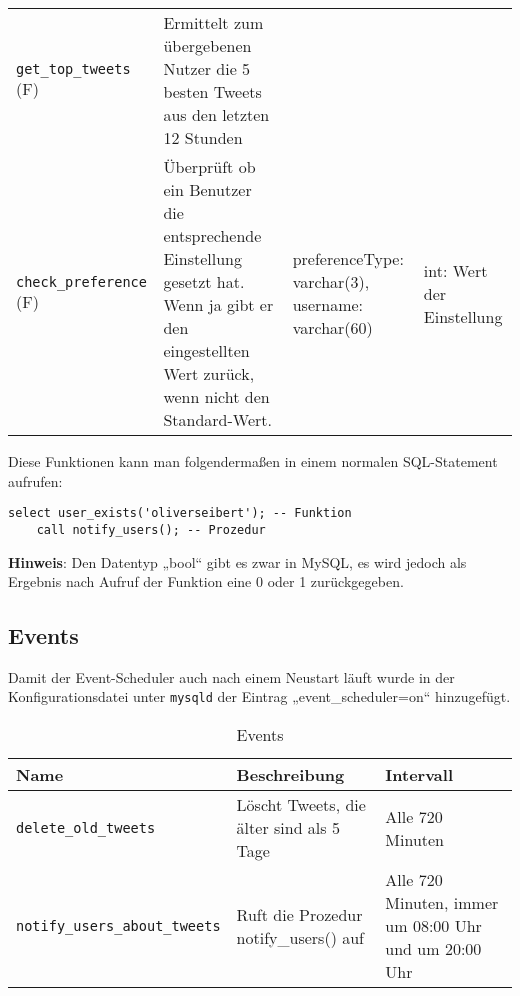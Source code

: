 \begin{table}[!ht]
\begin{tabular}{p{3.3cm}p{5.4cm}p{3.2cm}p{1.8cm}}
    \texttt{get\_top\_tweets} (F) & Ermittelt zum übergebenen Nutzer die 5 besten Tweets aus den letzten 12 Stunden & &  \\
    \texttt{check\_preference} (F) & Überprüft ob ein Benutzer die entsprechende Einstellung gesetzt hat. Wenn ja gibt er den eingestellten Wert zurück, wenn nicht den Standard-Wert.  & preferenceType: \newline varchar(3), \newline username: \newline varchar(60) & int: \newline Wert der \newline Einstellung \\
	\bottomrule
  \end{tabular}
\end{table}
\newpage
Diese Funktionen kann man folgendermaßen in einem normalen \acs{SQL}-Statement 
aufrufen:

\begin{lstlisting}[style=SQL]
	select user_exists('oliverseibert'); -- Funktion 
	call notify_users(); -- Prozedur
\end{lstlisting} 
\bigskip
\textbf{Hinweis}: Den Datentyp „bool“ gibt es zwar in MySQL, es wird jedoch als Ergebnis nach Aufruf der Funktion eine 0 oder 1 zurückgegeben.


\subsection{Events}
\label{subsec:events}
Damit der Event-Scheduler auch nach einem Neustart läuft wurde in der Konfigurationsdatei unter 
\texttt{mysqld} der Eintrag „event\_scheduler=on“ hinzugefügt.

\begin{table}[!ht]
\caption{Events}
  \begin{tabular}{p{4.8cm}p{4.4cm}p{4.6cm}}
    \toprule 
    \textbf{Name} & \textbf{Beschreibung} & \textbf{Intervall} \\
    \hline 
    \texttt{delete\_old\_tweets} & Löscht Tweets, die älter sind als 5 Tage & Alle 720 Minuten \\
    \texttt{notify\_users\_about\_tweets} & Ruft die Prozedur notify\_users() auf & Alle 720 Minuten, immer um 08:00 Uhr und um 20:00 Uhr \\
	\bottomrule
  \end{tabular}
\end{table}

